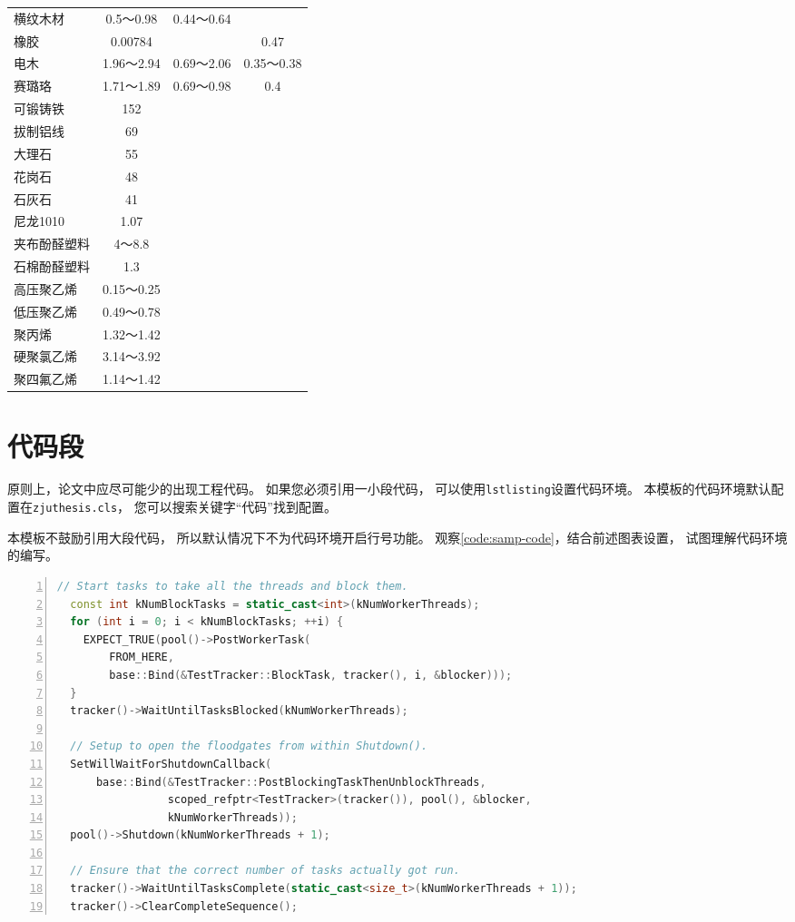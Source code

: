 \begin{longtabu}{lccc}
横纹木材   &  0.5～0.98 &  0.44～0.64 &   \\
橡胶     & 0.00784 &        & 0.47 \\
电木     &  1.96～2.94 &  0.69～2.06 &  0.35～0.38 \\
赛璐珞    &  1.71～1.89 &  0.69～0.98 & 0.4 \\
可锻铸铁   & 152    &        &  \\
拔制铝线   & 69     &        &  \\
大理石    & 55     &        &  \\
花岗石    & 48     &        &  \\
石灰石    & 41     &        &  \\
尼龙1010 & 1.07   &        &  \\
夹布酚醛塑料 &  4～8.8 &        &  \\
石棉酚醛塑料 & 1.3    &        &  \\
高压聚乙烯  &  0.15～0.25 &        &  \\
低压聚乙烯  &  0.49～0.78 &        &  \\
聚丙烯    &  1.32～1.42 &        &  \\
硬聚氯乙烯  &  3.14～3.92 &        &  \\
聚四氟乙烯  &  1.14～1.42 &        &  \\
\end{longtabu}%


\section{代码段}

原则上，论文中应尽可能少的出现工程代码。
如果您必须引用一小段代码，
可以使用\texttt{lstlisting}设置代码环境。
本模板的代码环境默认配置在\texttt{zjuthesis.cls}，
您可以搜索关键字“代码”找到配置。

本模板不鼓励引用大段代码，
所以默认情况下不为代码环境开启行号功能。
观察\autoref{code:samp-code}，结合前述图表设置，
试图理解代码环境的编写。

\begin{lstlisting}[language=C++,numbers=left, numberstyle=\tiny,label=code:samp-code, caption=一段Chromium的源代码]
// Start tasks to take all the threads and block them.
  const int kNumBlockTasks = static_cast<int>(kNumWorkerThreads);
  for (int i = 0; i < kNumBlockTasks; ++i) {
    EXPECT_TRUE(pool()->PostWorkerTask(
        FROM_HERE,
        base::Bind(&TestTracker::BlockTask, tracker(), i, &blocker)));
  }
  tracker()->WaitUntilTasksBlocked(kNumWorkerThreads);

  // Setup to open the floodgates from within Shutdown().
  SetWillWaitForShutdownCallback(
      base::Bind(&TestTracker::PostBlockingTaskThenUnblockThreads,
                 scoped_refptr<TestTracker>(tracker()), pool(), &blocker,
                 kNumWorkerThreads));
  pool()->Shutdown(kNumWorkerThreads + 1);

  // Ensure that the correct number of tasks actually got run.
  tracker()->WaitUntilTasksComplete(static_cast<size_t>(kNumWorkerThreads + 1));
  tracker()->ClearCompleteSequence();
\end{lstlisting}

